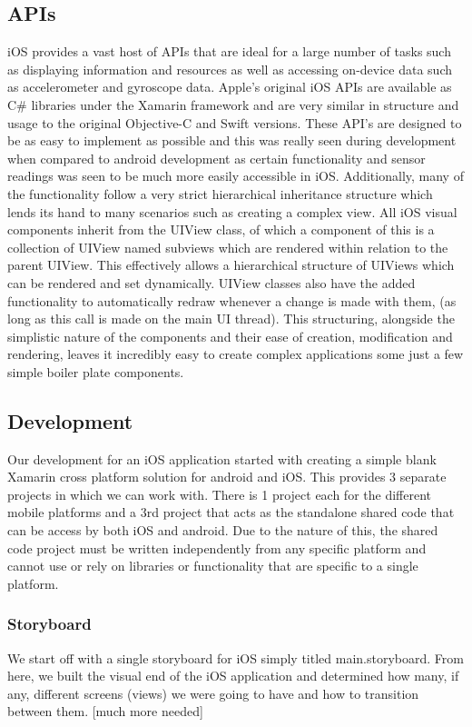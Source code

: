 \documentclass[main.tex]{subfiles}
\begin{document}
\subsection{APIs}
iOS provides a vast host of APIs that are ideal for a large number of tasks such as displaying information and resources as well as accessing on-device data such as accelerometer and gyroscope data. Apple’s original iOS APIs are available as C\# libraries under the Xamarin framework and are very similar in structure and usage to the original Objective-C and Swift versions. These API’s are designed to be as easy to implement as possible and this was really seen during development when compared to android development as certain functionality and sensor readings was seen to be much more easily accessible in iOS. Additionally, many of the functionality follow a very strict hierarchical inheritance structure which lends its hand to many scenarios such as creating a complex view. All iOS visual components inherit from the UIView class, of which a component of this is a collection of UIView named subviews which are rendered within relation to the parent UIView. This effectively allows a hierarchical structure of UIViews which can be rendered and set dynamically. UIView classes also have the added functionality to automatically redraw whenever a change is made with them, (as long as this call is made on the main UI thread). This structuring, alongside the simplistic nature of the components and their ease of creation, modification and rendering, leaves it incredibly easy to create complex applications some just a few simple boiler plate components.

\subsection{Development}

Our development for an iOS application started with creating a simple blank Xamarin cross platform solution for android and iOS. This provides 3 separate projects in which we can work with. There is 1 project each for the different mobile platforms and a 3rd project that acts as the standalone shared code that can be access by both iOS and android. Due to the nature of this, the shared code project must be written independently from any specific platform and cannot use or rely on libraries or functionality that are specific to a single platform.

\subsubsection{Storyboard}
We start off with a single storyboard for iOS simply titled main.storyboard. From here, we built the visual end of the iOS application and determined how many, if any, different screens (views) we were going to have and how to transition between them. [much more needed]
\end{document}
